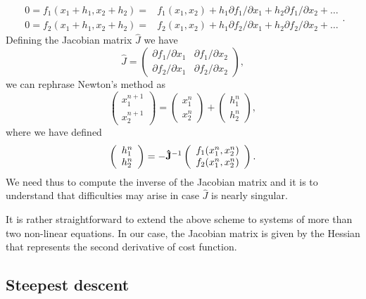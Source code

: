 \documentclass[%
oneside,                 %
final,                   %
10pt]{article}
\begin{document}
\[
   \begin{array}{cc} 0=f_1(x_1+h_1,x_2+h_2)=&f_1(x_1,x_2)+h_1
                     \partial f_1/\partial x_1+h_2
                     \partial f_1/\partial x_2+\dots\\
                     0=f_2(x_1+h_1,x_2+h_2)=&f_2(x_1,x_2)+h_1
                     \partial f_2/\partial x_1+h_2
                     \partial f_2/\partial x_2+\dots
                       \end{array}.
\]
Defining the Jacobian matrix $\hat{J}$ we have
\[
 \hat{J}=\left( \begin{array}{cc}
                         \partial f_1/\partial x_1  & \partial f_1/\partial x_2 \\
                          \partial f_2/\partial x_1     &\partial f_2/\partial x_2
             \end{array} \right),
\]
we can rephrase Newton's method as
\[
\left(\begin{array}{c} x_1^{n+1} \\ x_2^{n+1} \end{array} \right)=
\left(\begin{array}{c} x_1^{n} \\ x_2^{n} \end{array} \right)+
\left(\begin{array}{c} h_1^{n} \\ h_2^{n} \end{array} \right),
\]
where we have defined
\[
   \left(\begin{array}{c} h_1^{n} \\ h_2^{n} \end{array} \right)=
   -{\bf \hat{J}}^{-1}
   \left(\begin{array}{c} f_1(x_1^{n},x_2^{n}) \\ f_2(x_1^{n},x_2^{n}) \end{array} \right).
\]
We need thus to compute the inverse of the Jacobian matrix and it
is to understand that difficulties  may
arise in case $\hat{J}$ is nearly singular.

It is rather straightforward to extend the above scheme to systems of
more than two non-linear equations. In our case, the Jacobian matrix is given by the Hessian that represents the second derivative of cost function. 



\subsection*{Steepest descent}
\end{document}
